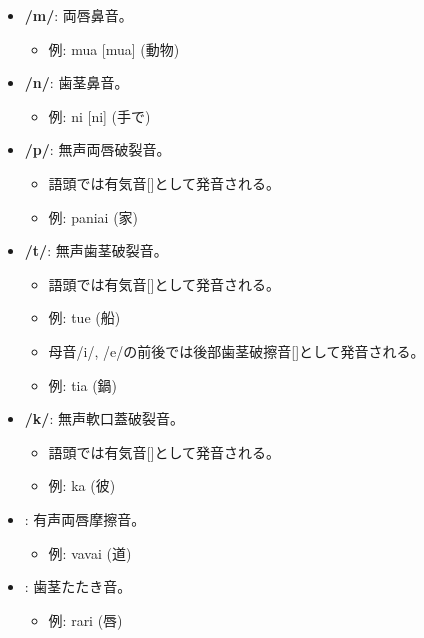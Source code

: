 \begin{itemize}
    \item \textbf{/m/}: 両唇鼻音。
    \begin{itemize}
        \item 例: mua [mua] (動物)
    \end{itemize}

    \item \textbf{/n/}: 歯茎鼻音。
    \begin{itemize}
        \item 例: ni [ni] (手で)
    \end{itemize}

    \item \textbf{/p/}: 無声両唇破裂音。
    \begin{itemize}
        \item 語頭では有気音[]として発音される。
        \item 例:  paniai  (家)
    \end{itemize}

    \item \textbf{/t/}: 無声歯茎破裂音。
    \begin{itemize}
        \item 語頭では有気音[]として発音される。
        \item 例: tue \textipa{[t\super{h}ue]} (船)
        \item 母音/i/, /e/の前後では後部歯茎破擦音[]として発音される。
        \item 例: tia \textipa{[tS\super{h}ia]} (鍋)
    \end{itemize}

    \item \textbf{/k/}: 無声軟口蓋破裂音。
    \begin{itemize}
        \item 語頭では有気音[]として発音される。
        \item 例: ka \textipa{[k\super{h}a]} (彼)
    \end{itemize}

    
    \item \textbf{}: 有声両唇摩擦音。
    \begin{itemize}
        \item 例: vavai \textipa{[BaBai]} (道)
    \end{itemize}
    
    \item \textbf{}: 歯茎たたき音。
    \begin{itemize}
        \item 例: rari \textipa{[RaRi]} (唇)
    \end{itemize}
\end{itemize}